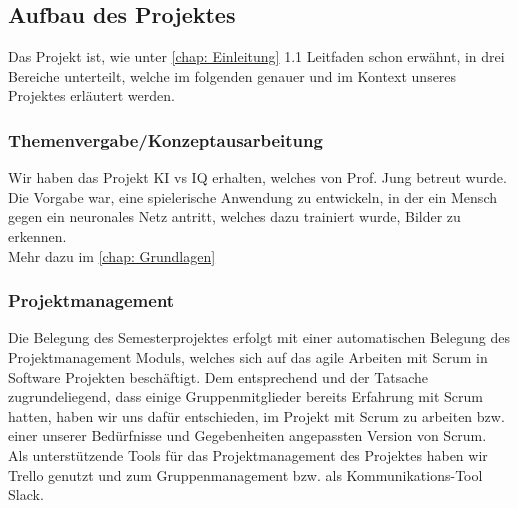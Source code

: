 \documentclass[11pt]{article}
\begin{document}
\subsection{Aufbau des Projektes}

Das Projekt ist, wie unter \autoref{chap: Einleitung} 1.1 Leitfaden schon erwähnt, in drei Bereiche unterteilt, welche im folgenden genauer und im Kontext unseres Projektes erläutert werden.

\subsubsection{ Themenvergabe/Konzeptausarbeitung }
\label{chap: Themenvergabe}

Wir haben das Projekt KI vs IQ erhalten, welches von Prof. Jung 		betreut wurde.\\
Die Vorgabe war, eine spielerische Anwendung zu entwickeln, 			in der ein Mensch gegen ein neuronales Netz antritt, welches 			dazu trainiert wurde, Bilder zu erkennen.\\
Mehr dazu im \autoref{chap: Grundlagen}
	
\subsubsection{  Projektmanagement }
\label{chap: Projektmanagement}
Die Belegung des Semesterprojektes erfolgt mit einer 						automatischen Belegung des Projektmanagement Moduls, 				welches sich auf das agile Arbeiten mit Scrum in Software 				Projekten beschäftigt. Dem entsprechend und der Tatsache 				zugrundeliegend, dass einige Gruppenmitglieder bereits 					Erfahrung mit Scrum hatten, haben wir uns dafür entschieden, im 	Projekt mit Scrum zu arbeiten bzw. einer unserer 						Bedürfnisse und Gegebenheiten angepassten Version von 				Scrum.\\
Als unterstützende Tools für das Projektmanagement des Projektes haben wir 	Trello genutzt und zum Gruppenmanagement bzw. als 		Kommunikations-Tool Slack.
\end{document}
